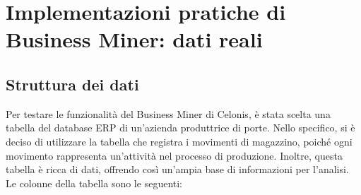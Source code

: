 \documentclass{article}
\begin{document}
\section{Implementazioni pratiche di Business Miner: dati reali}
\subsection{Struttura dei dati}
Per testare le funzionalità del Business Miner di Celonis, è stata scelta una tabella del database ERP di un'azienda produttrice di porte. Nello specifico, si è deciso di utilizzare la tabella che registra i movimenti di magazzino, poiché ogni movimento rappresenta un'attività nel processo di produzione. Inoltre, questa tabella è ricca di dati, offrendo così un'ampia base di informazioni per l'analisi.\\
Le colonne della tabella sono le seguenti:
\end{document}
